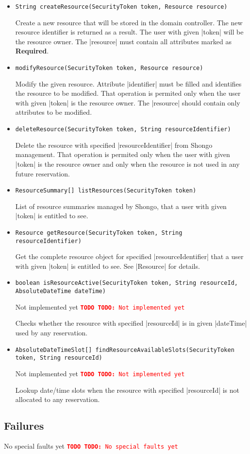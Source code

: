 \documentclass[a4paper]{report}
\newenvironment{Api}{\begin{itemize}}{\end{itemize}}
\newcommand{\ApiCode}[1]{\lstinline[style=styleApi]|#1|}
\newcommand{\ApiItem}[1]{\item #1 %

}
\newcommand{\ApiCmd}[1]{\ApiItem{\ApiCode{#1}}}
\newcommand{\ApiRequired}{{\color{blue!50!black}\textbf{Required}}}
\newenvironment{ApiFailures}{\begin{compactitem}}{\end{compactitem}}
\newcommand{\ApiFailure}[1]{\ApiItem{\ApiCode{faultCode = #1}}}
\newcommand{\TODO}[1]{%
\def\empty{}%
\def\prvniparametr{#1}%
\ifx\prvniparametr\empty%
\begingroup\tt\textcolor{red}{\noindent\textbf{TODO}}\endgroup
\else%
\begingroup\tt\textcolor{red}{\noindent\textbf{TODO:}\ #1}\endgroup
\fi%
}
\begin{document}
\begin{Api}

\ApiCmd{String createResource(SecurityToken token, Resource resource)}
Create a new resource that will be stored in the domain controller. The new resource identifier is returned as a result. The user with given |token| will be the resource owner. The |resource| must contain all attributes marked as \ApiRequired.

\ApiCmd{modifyResource(SecurityToken token, Resource resource)}
Modify the given resource. Attribute |identifier| must be filled and identifies the resource to be modified. That operation is permited only when the user with given |token| is the resource owner. The |resource| should contain only attributes to be modified.

\ApiCmd{deleteResource(SecurityToken token, String resourceIdentifier)}
Delete the resource with specified |resourceIdentifier| from Shongo management. That operation is permited only when the user with given |token| is the resource owner and only when the resource is not used in any future reservation.

\ApiCmd{ResourceSummary[] listResources(SecurityToken token)}
List of resource summaries managed by Shongo, that a user with given |token| is entitled to see.

\ApiCmd{Resource getResource(SecurityToken token, String resourceIdentifier)}
Get the complete resource object for specified |resourceIdentifier| that a user with given |token| is entitled to see. See |Resource| for details.

\ApiCmd{boolean isResourceActive(SecurityToken token, String resourceId, AbsoluteDateTime dateTime)}
\TODO{Not implemented yet}
Checks whether the resource with specified |resourceId| is in given |dateTime| used by any reservation.

\ApiCmd{AbsoluteDateTimeSlot[] findResourceAvailableSlots(SecurityToken token, String resourceId)}
\TODO{Not implemented yet}
Lookup date/time slots when the resource with specified |resourceId| is not allocated to any reservation.


\end{Api}

\subsection{Failures}

\TODO{No special faults yet}
\end{document}
